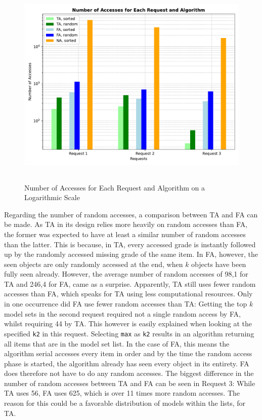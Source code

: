 \begin{figure}[htbp]
    \centering
    \includegraphics[height=10cm]{plots/grouped_accesses.pdf}
    \caption{Number of Accesses for Each Request and Algorithm on a Logarithmic Scale}
    \label{fig:access}
  \end{figure}


Regarding the number of random accesses, a comparison between TA and FA can be made. As TA in its design relies more heavily on random accesses than FA, the former was expected to have at least a similar number of random accesses than the latter. This is because, in TA, every accessed grade is instantly followed up by the randomly accessed missing grade of the same item. In FA, however, the seen objects are only randomly accessed at the end, when $k$ objects have been fully seen already. However, the average number of random accesses of 98,1 for TA and 246,4 for FA, came as a surprise. Apparently, TA still uses fewer random accesses than FA, which speaks for TA using less computational resources. Only in one occurrence did FA use fewer random accesses than TA: Getting the top $k$ model sets in the second request required not a single random access by FA, whilst requiring 44 by TA. This however is easily explained when looking at the specified \texttt{k2} in this request. Selecting \texttt{max} as \texttt{k2} results in an algorithm returning all items that are in the model set list. In the case of FA, this means the algorithm serial accesses every item in order and by the time the random access phase is started, the algorithm already has seen every object in its entirety. FA does therefore not have to do any random accesses. The biggest difference in the number of random accesses between TA and FA can be seen in Request 3: While TA uses 56, FA uses 625, which is over 11 times more random accesses. The reason for this could be a favorable distribution of models within the lists, for TA.


